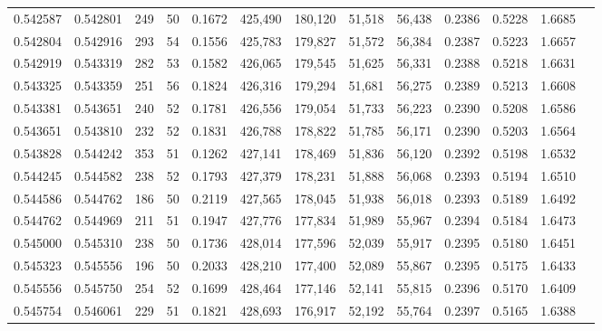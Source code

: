\begin{tabular}{rrrrrrrrrrrrr}
0.542587 & 0.542801 &    249 &    50 &                                     0.1672 & 425,490 & 180,120 &  51,518 &  56,438 & 0.2386 & 0.5228 & 1.6685 \\
0.542804 & 0.542916 &    293 &    54 &                                     0.1556 & 425,783 & 179,827 &  51,572 &  56,384 & 0.2387 & 0.5223 & 1.6657 \\
0.542919 & 0.543319 &    282 &    53 &                                     0.1582 & 426,065 & 179,545 &  51,625 &  56,331 & 0.2388 & 0.5218 & 1.6631 \\
0.543325 & 0.543359 &    251 &    56 &                                     0.1824 & 426,316 & 179,294 &  51,681 &  56,275 & 0.2389 & 0.5213 & 1.6608 \\
0.543381 & 0.543651 &    240 &    52 &                                     0.1781 & 426,556 & 179,054 &  51,733 &  56,223 & 0.2390 & 0.5208 & 1.6586 \\
0.543651 & 0.543810 &    232 &    52 &                                     0.1831 & 426,788 & 178,822 &  51,785 &  56,171 & 0.2390 & 0.5203 & 1.6564 \\
0.543828 & 0.544242 &    353 &    51 &                                     0.1262 & 427,141 & 178,469 &  51,836 &  56,120 & 0.2392 & 0.5198 & 1.6532 \\
0.544245 & 0.544582 &    238 &    52 &                                     0.1793 & 427,379 & 178,231 &  51,888 &  56,068 & 0.2393 & 0.5194 & 1.6510 \\
0.544586 & 0.544762 &    186 &    50 &                                     0.2119 & 427,565 & 178,045 &  51,938 &  56,018 & 0.2393 & 0.5189 & 1.6492 \\
0.544762 & 0.544969 &    211 &    51 &                                     0.1947 & 427,776 & 177,834 &  51,989 &  55,967 & 0.2394 & 0.5184 & 1.6473 \\
0.545000 & 0.545310 &    238 &    50 &                                     0.1736 & 428,014 & 177,596 &  52,039 &  55,917 & 0.2395 & 0.5180 & 1.6451 \\
0.545323 & 0.545556 &    196 &    50 &                                     0.2033 & 428,210 & 177,400 &  52,089 &  55,867 & 0.2395 & 0.5175 & 1.6433 \\
0.545556 & 0.545750 &    254 &    52 &                                     0.1699 & 428,464 & 177,146 &  52,141 &  55,815 & 0.2396 & 0.5170 & 1.6409 \\
0.545754 & 0.546061 &    229 &    51 &                                     0.1821 & 428,693 & 176,917 &  52,192 &  55,764 & 0.2397 & 0.5165 & 1.6388 \\

\end{tabular}

